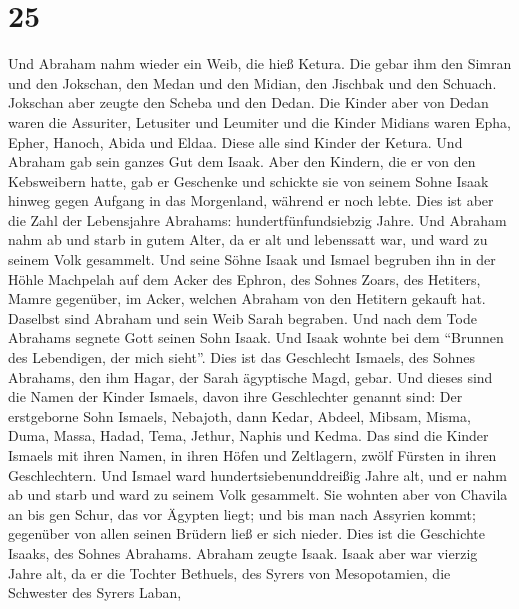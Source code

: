 \hypertarget{section-24}{%
\section{25}\label{section-24}}

 Und Abraham nahm wieder ein Weib, die hieß Ketura.
 Die gebar ihm den Simran und den Jokschan, den Medan und
den Midian, den Jischbak und den Schuach.  Jokschan aber
zeugte den Scheba und den Dedan. Die Kinder aber von Dedan waren die
Assuriter, Letusiter und Leumiter  und die Kinder Midians
waren Epha, Epher, Hanoch, Abida und Eldaa. Diese alle sind Kinder der
Ketura.  Und Abraham gab sein ganzes Gut dem Isaak.
 Aber den Kindern, die er von den Kebsweibern hatte, gab
er Geschenke und schickte sie von seinem Sohne Isaak hinweg gegen
Aufgang in das Morgenland, während er noch lebte.  Dies
ist aber die Zahl der Lebensjahre Abrahams: hundertfünfundsiebzig Jahre.
 Und Abraham nahm ab und starb in gutem Alter, da er alt
und lebenssatt war, und ward zu seinem Volk gesammelt. 
Und seine Söhne Isaak und Ismael begruben ihn in der Höhle Machpelah auf
dem Acker des Ephron, des Sohnes Zoars, des Hetiters, Mamre gegenüber,
 im Acker, welchen Abraham von den Hetitern gekauft hat.
Daselbst sind Abraham und sein Weib Sarah begraben.  Und
nach dem Tode Abrahams segnete Gott seinen Sohn Isaak. Und Isaak wohnte
bei dem ``Brunnen des Lebendigen, der mich sieht''.  Dies
ist das Geschlecht Ismaels, des Sohnes Abrahams, den ihm Hagar, der
Sarah ägyptische Magd, gebar.  Und dieses sind die Namen
der Kinder Ismaels, davon ihre Geschlechter genannt sind: Der
erstgeborne Sohn Ismaels, Nebajoth, dann Kedar, Abdeel, Mibsam,
 Misma, Duma, Massa,  Hadad, Tema, Jethur,
Naphis und Kedma.  Das sind die Kinder Ismaels mit ihren
Namen, in ihren Höfen und Zeltlagern, zwölf Fürsten in ihren
Geschlechtern.  Und Ismael ward hundertsiebenunddreißig
Jahre alt, und er nahm ab und starb und ward zu seinem Volk gesammelt.
 Sie wohnten aber von Chavila an bis gen Schur, das vor
Ägypten liegt; und bis man nach Assyrien kommt; gegenüber von allen
seinen Brüdern ließ er sich nieder.  Dies ist die
Geschichte Isaaks, des Sohnes Abrahams. Abraham zeugte Isaak.
 Isaak aber war vierzig Jahre alt, da er die Tochter
Bethuels, des Syrers von Mesopotamien, die Schwester des Syrers Laban,
